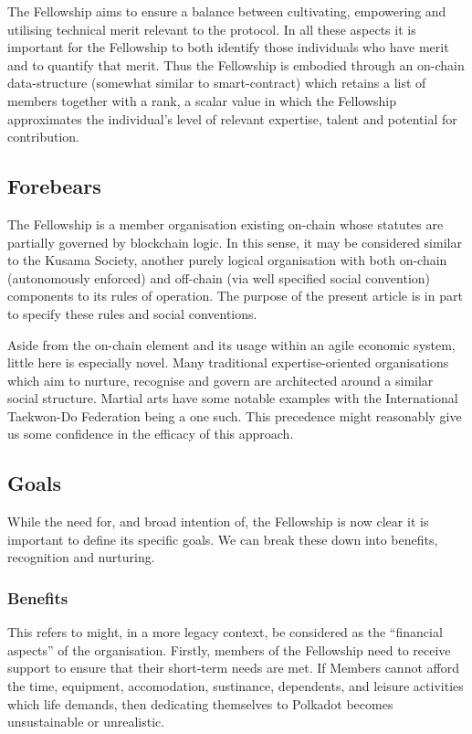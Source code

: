 \documentclass[9pt,oneside]{amsart}
\begin{document}
The Fellowship aims to ensure a balance between cultivating, empowering and utilising technical merit relevant to the protocol. In all these aspects it is important for the Fellowship to both identify those individuals who have merit and to quantify that merit. Thus the Fellowship is embodied through an on-chain data-structure (somewhat similar to smart-contract) which retains a list of members together with a rank, a scalar value in which the Fellowship approximates the individual's level of relevant expertise, talent and potential for contribution.

\subsection{Forebears}

The Fellowship is a member organisation existing on-chain whose statutes are partially governed by blockchain logic. In this sense, it may be considered similar to the Kusama Society, another purely logical organisation with both on-chain (autonomously enforced) and off-chain (via well specified social convention) components to its rules of operation. The purpose of the present article is in part to specify these rules and social conventions.

Aside from the on-chain element and its usage within an agile economic system, little here is especially novel. Many traditional expertise-oriented organisations which aim to nurture, recognise and govern are architected around a similar social structure. Martial arts have some notable examples with the International Taekwon-Do Federation being a one such. This precedence might reasonably give us some confidence in the efficacy of this approach.

\subsection{Goals}\label{goals}

While the need for, and broad intention of, the Fellowship is now clear it is important to define its specific goals. We can break these down into benefits, recognition and nurturing.

\subsubsection{Benefits}

This refers to might, in a more legacy context, be considered as the ``financial aspects'' of the organisation. Firstly, members of the Fellowship need to receive support to ensure that their short-term needs are met. If Members cannot afford the time, equipment, accomodation, sustinance, dependents, and leisure activities which life demands, then dedicating themselves to Polkadot becomes unsustainable or unrealistic.
\end{document}
